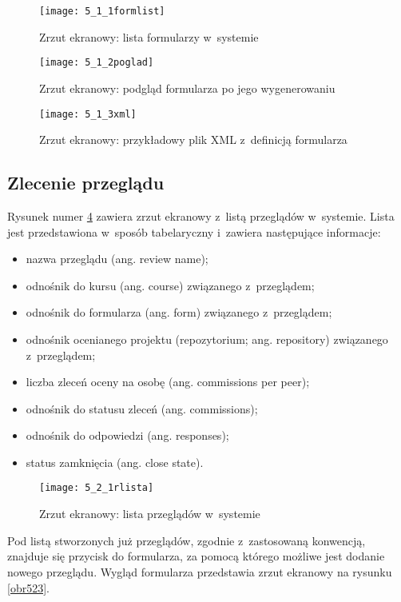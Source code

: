 \begin{figure}[!h]
\centering
    \texttt{[image: 5\_1\_1formlist]}
    \caption{Zrzut ekranowy: lista formularzy w~systemie}
    \label{obr511}
\end{figure}


\begin{figure}[!h]
\centering
    \texttt{[image: 5\_1\_2poglad]}
    \caption{Zrzut ekranowy: podgląd formularza po jego wygenerowaniu}
    \label{obr512}
\end{figure}


\begin{figure}[!h]
\centering
    \texttt{[image: 5\_1\_3xml]}
    \caption{Zrzut ekranowy: przykładowy plik XML z~definicją formularza}
    \label{obr513}
\end{figure}

\clearpage
\subsection{Zlecenie przeglądu}
Rysunek numer \ref{obr521} zawiera zrzut ekranowy z~listą przeglądów w~systemie. Lista jest przedstawiona w~sposób tabelaryczny i~zawiera następujące informacje:
\begin{itemize}
    \item nazwa przeglądu (ang. review name);
    \item odnośnik do kursu (ang. course) związanego z~przeglądem;
    \item odnośnik do formularza (ang. form) związanego z~przeglądem;
    \item odnośnik ocenianego projektu (repozytorium; ang. repository) związanego z~przeglądem;
    \item liczba zleceń oceny na osobę (ang. commissions per peer);
    \item odnośnik do statusu zleceń (ang. commissions);
    \item odnośnik do odpowiedzi (ang. responses);
    \item status zamknięcia (ang. close state).
\end{itemize}

\begin{figure}[!h]
    \texttt{[image: 5\_2\_1rlista]}
    \caption{Zrzut ekranowy: lista przeglądów w~systemie}
    \label{obr521}
\end{figure}

\medskip
Pod listą stworzonych już przeglądów, zgodnie z~zastosowaną konwencją, znajduje się przycisk do formularza, za pomocą którego możliwe jest dodanie nowego przeglądu. Wygląd formularza przedstawia zrzut ekranowy na rysunku \ref{obr523}.

